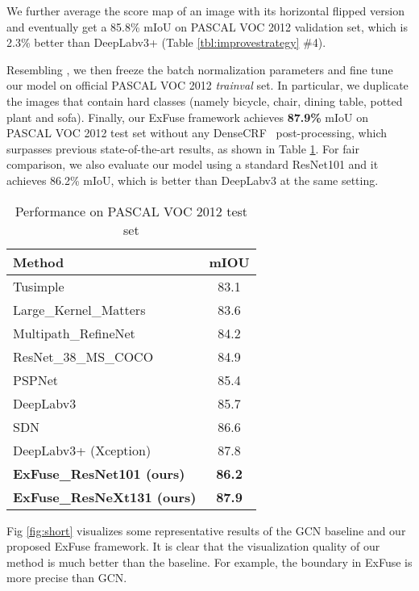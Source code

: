 \documentclass[runningheads]{llncs}
\begin{document}
We further average the score map of an image with its horizontal flipped version and eventually get a 85.8\% mIoU on PASCAL VOC 2012 validation set, which is 2.3\% better than DeepLabv3+ \cite{Chen2018Encoder} (Table \ref{tbl:improvestrategy} \#4). 

Resembling \cite{Chen2017Rethinking}, we then freeze the batch normalization parameters and fine tune our model on official PASCAL VOC 2012 \emph{trainval} set. In particular, we duplicate the images that contain hard classes (namely bicycle, chair, dining table, potted plant and sofa). Finally, our ExFuse framework achieves \textbf{87.9\%} mIoU on PASCAL VOC 2012 test set without any DenseCRF~\cite{krahenbuhl2011efficient} post-processing, which surpasses previous state-of-the-art results, as shown in Table \ref{tbl:voctestresults}. For fair comparison, we also evaluate our model using a standard ResNet101 and it achieves 86.2\% mIoU, which is better than DeepLabv3 at the same setting.


\begin{table}
\begin{center}
\begin{tabular}{|l|c|}
\hline
Method  & mIOU \\
\hline
\hline
Tusimple \cite{Wang2017Understanding}    & 83.1 \\
Large\_Kernel\_Matters \cite{Peng2017Large}    & 83.6 \\
Multipath\_RefineNet \cite{Lin2016RefineNet}   & 84.2 \\
ResNet\_38\_MS\_COCO \cite{Wu2016Wider}  & 84.9 \\
PSPNet \cite{Zhao2016Pyramid}   & 85.4 \\
DeepLabv3 \cite{Chen2017Rethinking}   & 85.7\\
SDN  \cite{Fu2017Stacked} & 86.6 \\
DeepLabv3+ (Xception) \cite{Chen2018Encoder} & 87.8 \\
\hline
\textbf{ExFuse\_ResNet101 (ours)}  & \textbf{86.2} \\
\textbf{ExFuse\_ResNeXt131 (ours)} & \textbf{87.9} \\
\hline
\end{tabular}
\end{center}
\caption{Performance on PASCAL VOC 2012 test set}

\label{tbl:voctestresults}
\end{table}
Fig \ref{fig:short} visualizes some representative results of the GCN \cite{Peng2017Large} baseline and our proposed ExFuse framework. It is clear that the visualization quality of our method is much better than the baseline. For example, the boundary in ExFuse is more precise than GCN. 
\end{document}
